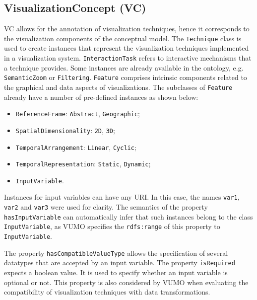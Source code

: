 \documentclass[]{interact}
\theoremstyle{plain}%
\theoremstyle{definition}
\theoremstyle{remark}
\theoremstyle{definition}
\begin{document}
\subsection{VisualizationConcept (VC)}
\label{sec:vc}

VC allows for the annotation of visualization techniques, hence it corresponds to the visualization components of the conceptual model. The \texttt{Technique} class is used to create instances that represent the visualization techniques implemented in a visualization system. \texttt{InteractionTask} refers to interactive mechanisms that a technique provides. Some instances are already available in the ontology, e.g. \texttt{SemanticZoom} or \texttt{Filtering}. \texttt{Feature} comprises intrinsic components related to the graphical and data aspects of visualizations. The subclasses of \texttt{Feature} already have a number of pre-defined instances as shown below:

\begin{itemize}
\item \texttt{ReferenceFrame}: \texttt{Abstract}, \texttt{Geographic};
\item \texttt{SpatialDimensionality}: \texttt{2D}, \texttt{3D};
\item \texttt{TemporalArrangement}: \texttt{Linear}, \texttt{Cyclic};
\item \texttt{TemporalRepresentation}: \texttt{Static}, \texttt{Dynamic};
\item \texttt{InputVariable}.
\end{itemize}


Instances for input variables can have any URI. In this case, the names \texttt{var1}, \texttt{var2} and \texttt{var3} were used for clarity. The semantics of the property \texttt{hasInputVariable} can automatically infer that such instances belong to the class \texttt{InputVariable}, as VUMO specifies the \texttt{rdfs:range} of this property to \texttt{InputVariable}.

The property \texttt{hasCompatibleValueType} allows the specification of several datatypes that are accepted by an input variable. %
The property \texttt{isRequired} expects a boolean value. It is used to specify whether an input variable is optional or not. This property is also considered by VUMO when evaluating the compatibility of visualization techniques with data transformations.
%
\end{document}
